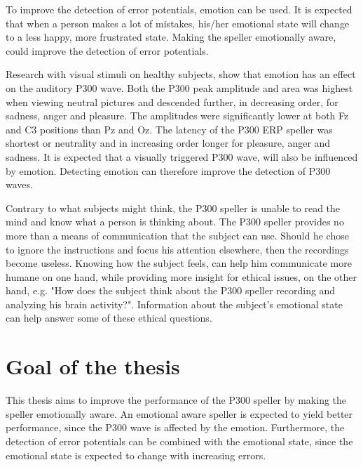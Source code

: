 \npar

To improve the detection of error potentials, emotion can be used. It is expected that when a person makes a lot of mistakes, his/her emotional state will change to a less happy, more frustrated state. Making the speller emotionally aware, could improve the detection of error potentials.

\npar

Research with visual stimuli on healthy subjects, show that emotion has an effect on the auditory P300 wave\cite{AuditoryP300Effect}. Both the P300 peak amplitude and area was highest when viewing neutral pictures and descended further, in decreasing order, for sadness, anger and pleasure. The amplitudes were significantly lower at both Fz and C3 positions than Pz and Oz. The latency of the P300 ERP speller was shortest or neutrality and in increasing order longer for pleasure, anger and sadness. It is expected that a visually triggered P300 wave, will also be influenced by emotion. Detecting emotion can therefore improve the detection of P300 waves.

\npar

Contrary to what subjects might think, the P300 speller is unable to read the mind and know what a person is thinking about\cite{P300Origin}. The P300 speller provides no more than a means of communication that the subject can use. Should he chose to ignore the instructions and focus his attention elsewhere, then the recordings become useless. Knowing how the subject feels, can help him communicate more humane on one hand, while providing more insight for ethical issues, on the other hand, e.g. "How does the subject think about the P300 speller recording and analyzing his brain activity?". Information about the subject's emotional state can help answer some of these ethical questions.


\section{Goal of the thesis}

This thesis aims to improve the performance of the P300 speller by making the speller emotionally aware. An emotional aware speller is expected to yield better performance, since the P300 wave is affected by the emotion. Furthermore, the detection of error potentials can be combined with the emotional state, since the emotional state is expected to change with increasing errors.

\npar

